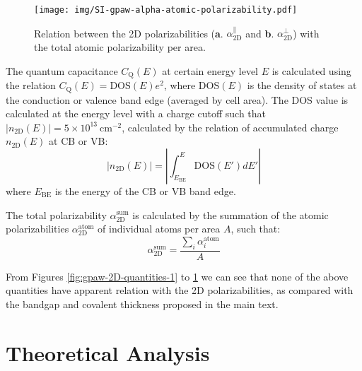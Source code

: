 \documentclass[manuscript=suppinfo,email=true,hyperref=true,keywords=false]{achemso}
\begin{document}
\begin{figure}[htbp]
  \centering
  \texttt{[image: img/SI-gpaw-alpha-atomic-polarizability.pdf]}
  \caption{Relation between the 2D polarizabilities
    (\textbf{a}. $\alpha_{\mathrm{2D}}^{\parallel}$ and
    \textbf{b}. $\alpha_{\mathrm{2D}}^{\perp}$) with the total atomic polarizability per area.}
  \label{fig:gpaw-2D-quantities-3}
\end{figure}

The quantum capacitance
$C_{\mathrm{Q}}(E)$ at certain energy level $E$ is calculated using
the relation $C_{\mathrm{Q}}(E)=\mathrm{DOS}(E)e^{2}$, where
$\mathrm{DOS}(E)$ is the density of states at the conduction or valence band edge (averaged by cell
area). The DOS value is calculated at the energy level with a charge
cutoff such that
$|n_{\mathrm{2D}}(E)| = 5 \times 10^{13}\ \mathrm{cm}^{-2}$, calculated by
the relation of accumulated charge $n_{\mathrm{2D}}(E)$ at CB or VB:
\begin{equation}
  \label{eq:CQ-method}
  |n_{\mathrm{2D}}(E)| = \left|\int_{E_{\mathrm{BE}}}^{E} \mathrm{DOS}(E') dE' \right|
\end{equation}
where $E_{\mathrm{BE}}$ is the energy of the CB or VB band edge.

The total polarizability $\alpha_{\mathrm{2D}}^{\mathrm{sum}}$ is calculated by the
summation of the atomic polarizabilities $\alpha_{\mathrm{2D}}^{\mathrm{atom}}$
\cite{Gould_2016_jctc} of individual atoms per area $A$, such that:
\begin{equation}
  \label{eq:atom-polar}
  \alpha_{\mathrm{2D}}^{\mathrm{sum}} = \frac{\sum_{i} \alpha^{\mathrm{atom}}_{i}}{A}
\end{equation}

From Figures \ref{fig:gpaw-2D-quantities-1} to
\ref{fig:gpaw-2D-quantities-3} we can see that none of the above
quantities have apparent relation with the 2D polarizabilities, as
compared with the bandgap and covalent thickness proposed in the main
text. 


\section{Theoretical Analysis}
\label{sec:theory}
\end{document}
